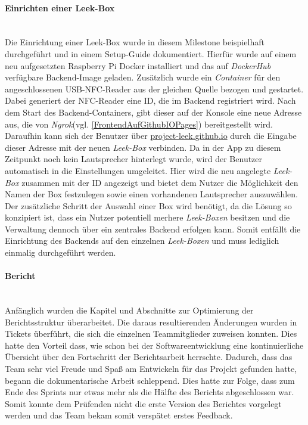 \documentclass[10pt, a4paper]{article}
\begin{document}
\begin{onehalfspace}
\paragraph*{Einrichten einer Leek-Box} $~$ \\
Die Einrichtung einer Leek-Box wurde in diesem Milestone beispielhaft durchgeführt und in einem Setup-Guide dokumentiert. Hierfür wurde auf einem neu aufgesetzten Raspberry Pi Docker installiert
und das auf \textit{DockerHub} verfügbare Backend-Image geladen. Zusätzlich wurde ein \textit{Container} für den angeschlossenen USB-NFC-Reader aus der gleichen Quelle bezogen und gestartet. Dabei
generiert der NFC-Reader eine ID, die im Backend registriert wird. Nach dem Start des Backend-Containers, gibt dieser auf der Konsole eine neue Adresse aus, die von \textit{Ngrok}(vgl. \ref{FrontendAufGithubIOPages})
bereitgestellt wird. Daraufhin kann sich der Benutzer über \url{project-leek.github.io} durch die Eingabe dieser Adresse mit der neuen \textit{Leek-Box} verbinden. Da in der App zu diesem Zeitpunkt noch kein
Lautsprecher hinterlegt wurde, wird der Benutzer automatisch in die Einstellungen umgeleitet. Hier wird die neu angelegte \textit{Leek-Box} zusammen mit der ID angezeigt und bietet dem Nutzer die Möglichkeit den Namen
der Box festzulegen sowie einen vorhandenen Lautsprecher auszuwählen. Der zusätzliche Schritt der Auswahl einer Box wird benötigt, da die Lösung so konzipiert ist, dass ein Nutzer potentiell merhere \textit{Leek-Boxen}
besitzen und die Verwaltung dennoch über ein zentrales Backend erfolgen kann. Somit entfällt die Einrichtung des Backends auf den einzelnen \textit{Leek-Boxen} und muss lediglich einmalig durchgeführt werden.

\paragraph*{Bericht} $~$ \\
Anfänglich wurden die Kapitel und Abschnitte zur Optimierung der Berichtsstruktur überarbeitet.
Die daraus resultierenden Änderungen wurden in Tickets überführt, die sich die einzelnen Teammitglieder zuweisen konnten.
Dies hatte den Vorteil dass, wie schon bei der Softwareentwicklung eine kontinuierliche Übersicht über den Fortschritt der Berichtsarbeit herrschte.
Dadurch, dass das Team sehr viel Freude und Spaß am Entwickeln für das Projekt gefunden hatte, begann die dokumentarische Arbeit schleppend.
Dies hatte zur Folge, dass zum Ende des Sprints nur etwas mehr als die Hälfte des Berichts abgeschlossen war. Somit konnte dem Prüfenden nicht die erste Version des Berichtes vorgelegt werden und das Team bekam somit verspätet erstes Feedback.


\end{onehalfspace}
\end{document}
